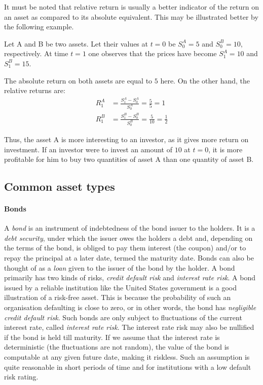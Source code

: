 It must be noted that relative return is usually a better indicator of the return on an asset as compared to its absolute equivalent. This may be illustrated better by the following example.
\begin{eg}
	Let A and B be two assets. Let their values at $ t = 0 $ be $ S_0^A = 5 $ and $ S_0^B = 10 $, respectively. At time $ t = 1 $ one observes that the prices have become $ S_1^A = 10 $ and $ S_1^B = 15 $.
	
	The absolute return on both assets are equal to $ 5 $ here. On the other hand, the relative returns are:
	\begin{align*}
		R_1^A  &=  \frac{S_1^A - S_0^A}{S_0^A} = \frac{5}{5} = 1  \\
		R_1^B  &=  \frac{S_1^B - S_0^B}{S_0^B} = \frac{5}{10} = \frac{1}{2}
	\end{align*}
	
	Thus, the asset A is more interesting to an investor, as it gives more return on investment. If an investor were to invest an amount of $ 10 $ at $ t = 0 $, it is more profitable for him to buy two quantities of asset A than one quantity of asset B.
\end{eg}


\subsection{Common asset types}

\paragraph{Bonds}
A \emph{bond} is an instrument of indebtedness of the bond issuer to the holders. It is a \emph{debt security}, under which the issuer owes the holders a debt and, depending on the terms of the bond, is obliged to pay them interest (the coupon) and/or to repay the principal at a later date, termed the maturity date. Bonds can also be thought of as a \emph{loan} given to the issuer of the bond by the holder. A bond primarily has two kinds of risks, \emph{credit default risk} and \emph{interest rate risk}. A bond issued by a reliable institution like the United States government is a good illustration of a risk-free asset. This is because the probability of such an organisation defaulting is close to zero, or in other words, the bond has \emph{negligible} \emph{credit default risk}. Such bonds are only subject to fluctuations of the current interest rate, called \emph{interest rate risk}. The interest rate risk may also be nullified if the bond is held till maturity. If we assume that the interest rate is deterministic (the fluctuations are not random), the value of the bond is computable at any given future date, making it riskless. Such an assumption is quite reasonable in short periods of time and for institutions with a low default risk rating.


